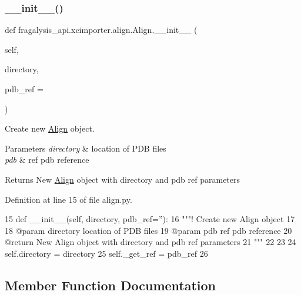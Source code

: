\subsubsection{\texorpdfstring{\+\_\+\+\_\+init\+\_\+\+\_\+()}{\_\_init\_\_()}}
{\footnotesize\ttfamily def fragalysis\+\_\+api.\+xcimporter.\+align.\+Align.\+\_\+\+\_\+init\+\_\+\+\_\+ (\begin{DoxyParamCaption}\item[{}]{self,  }\item[{}]{directory,  }\item[{}]{pdb\+\_\+ref = {\ttfamily \textquotesingle{}\textquotesingle{}} }\end{DoxyParamCaption})}



Create new \hyperlink{classfragalysis__api_1_1xcimporter_1_1align_1_1_align}{Align} object. 


\begin{DoxyParams}{Parameters}
{\em directory} & location of P\+DB files \\
\hline
{\em pdb} & ref pdb reference \\
\hline
\end{DoxyParams}
\begin{DoxyReturn}{Returns}
New \hyperlink{classfragalysis__api_1_1xcimporter_1_1align_1_1_align}{Align} object with directory and pdb ref parameters 
\end{DoxyReturn}


Definition at line 15 of file align.\+py.


\begin{DoxyCode}
15     \textcolor{keyword}{def }\_\_init\_\_(self, directory, pdb\_ref=''):
16         \textcolor{stringliteral}{"""! Create new Align object}
17 \textcolor{stringliteral}{}
18 \textcolor{stringliteral}{        @param directory location of PDB files}
19 \textcolor{stringliteral}{        @param pdb ref pdb reference}
20 \textcolor{stringliteral}{        @return New Align object with directory and pdb ref parameters}
21 \textcolor{stringliteral}{        """}
22 
23 
24         self.directory = directory
25         self.\_get\_ref = pdb\_ref
26 
\end{DoxyCode}


\subsection{Member Function Documentation}
\mbox{\label{classfragalysis__api_1_1xcimporter_1_1align_1_1_align_a554c8cc5acbc9f5e86bb668c49ea1254}} 

